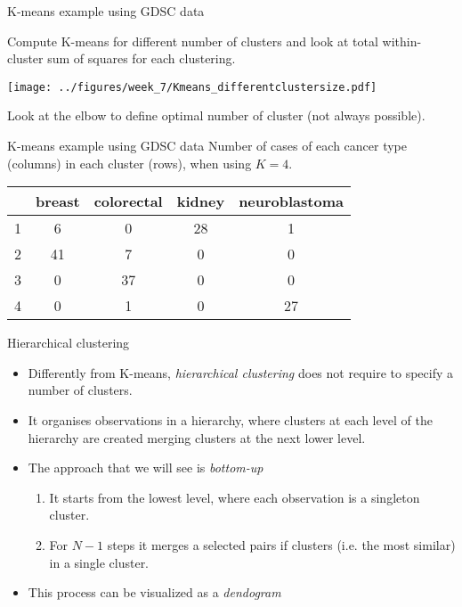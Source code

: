 \documentclass[notes]{beamer}          %
\begin{document}
\begin{frame}{K-means example using GDSC data}

Compute K-means for different number of clusters and look at total within-cluster sum of squares for each clustering. 
\begin{center}
\texttt{[image: ../figures/week\_7/Kmeans\_differentclustersize.pdf]}  
\end{center}
Look at the elbow to define optimal number of cluster (not always possible).
\end{frame}

\begin{frame}{K-means example using GDSC data}
Number of cases of each cancer type (columns) in each cluster (rows), when using $K=4$.
\begin{center}
\begin{tabular}{ c | | c | c | c | c }
& breast & colorectal & kidney & neuroblastoma \\
\hline \hline
1 & 6 & 0 & 28 & 1 \\ 
2 & 41 & 7 & 0 & 0\\
3 & 0 & 37 & 0 & 0\\
4 & 0 & 1 & 0 & 27\\
\end{tabular}
\end{center}
\end{frame}



\begin{frame}{Hierarchical clustering}
\begin{itemize}
\item Differently from K-means, \textit{hierarchical clustering} does not require to specify a number of clusters.
\item It organises observations in a hierarchy, where clusters at each level of the hierarchy are created merging clusters at the next lower level.
\item The approach that we will see is \textit{bottom-up}
\begin{enumerate}
 \item It starts from the lowest level, where each observation is a singleton cluster.
 \item For $N-1$ steps it merges a selected pairs if clusters (i.e. the most similar) in a single cluster.
\end{enumerate}
\item This process can be visualized as a \textit{dendogram}
\end{itemize}
\end{frame}
\end{document}

